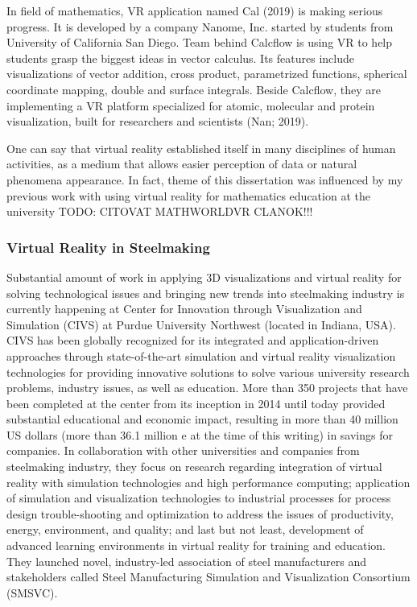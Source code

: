 In field of mathematics, VR application named Cal (2019) is making serious progress. It is developed by a company Nanome, Inc. started by students from University of California San Diego. Team behind Calcflow is using VR to help students grasp the biggest ideas in vector calculus. Its features include visualizations of vector addition, cross product, parametrized functions, spherical coordinate mapping, double and surface integrals. Beside Calcflow, they are implementing a VR platform specialized for atomic, molecular and protein visualization, built for researchers and scientists (Nan; 2019).

One can say that virtual reality established itself in many disciplines of human activities, as a medium that allows easier perception of data or natural phenomena appearance. In fact, theme of this dissertation was influenced by my previous work with using virtual reality for mathematics education at the university TODO: CITOVAT MATHWORLDVR CLANOK!!!

\subsubsection{Virtual Reality in Steelmaking}

Substantial amount of work in applying 3D visualizations and virtual reality for solving technological issues and bringing new trends into steelmaking industry is currently happening at Center for Innovation through Visualization and Simulation (CIVS) at Purdue University Northwest (located in Indiana, USA). CIVS has been globally recognized for its integrated and application-driven approaches through state-of-the-art simulation and virtual reality visualization technologies for providing innovative solutions to solve various university research problems, industry issues, as well as education. More than 350 projects that have been completed at the center from its inception in 2014 until today provided substantial educational and economic impact, resulting in more than 40 million US dollars (more than 36.1 million e at the time of this writing) in savings for companies. In collaboration with other universities and companies from steelmaking industry, they focus on research regarding integration of virtual reality with simulation technologies and high performance computing; application of simulation and visualization technologies to industrial processes for process design trouble-shooting and optimization to address the issues of productivity, energy, environment, and quality; and last but not least, development of advanced learning environments in virtual reality for training and education. They launched novel, industry-led association of steel manufacturers and stakeholders called Steel Manufacturing Simulation and Visualization Consortium (SMSVC).


